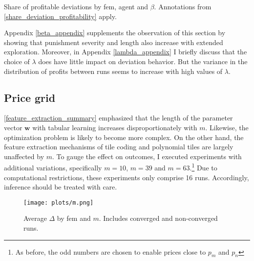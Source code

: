\begin{table}
	\centering
	
	\caption[Share of profitable deviations by \gls{fem}, agent and $\beta$]{Share of profitable deviations by \gls{fem}, agent and $\beta$. Annotations from \autoref{share_deviation_profitability} apply.}
	\label{share_deviation_profitability_beta}
\end{table}

Appendix \ref{beta_appendix} supplements the observation of this section by showing that punishment severity and length also increase with extended exploration. Moreover, in Appendix \ref{lambda_appendix} I briefly discuss that the choice of $\lambda$ does have little impact on deviation behavior. But the variance in the distribution of profits between runs seems to increase with high values of $\lambda$.

\subsection{Price grid}\label{price_grid_section}

\autoref{feature_extraction_summary} emphasized that the length of the parameter vector $\boldsymbol{w}$ with tabular learning increases disproportionately with $m$. Likewise, the optimization problem is likely to become more complex. On the other hand, the feature extraction mechanisms of tile coding and polynomial tiles are largely unaffected by $m$. To gauge the effect on outcomes, I executed experiments with additional variations, specifically $m=10$, $m = 39$ and $m = 63$.\footnote{As before, the odd numbers are chosen to enable prices close to $p_m$ and $p_n$} Due to computational restrictions, these experiments  only comprise 16 runs. Accordingly, inference should be treated with care.

\begin{figure}
	\texttt{[image: plots/m.png]}
	\caption[Average $\Delta$ by \gls{fem} and $m$]{Average $\Delta$ by \gls{fem} and $m$. Includes converged and non-converged runs.}
	\label{m}
\end{figure}

